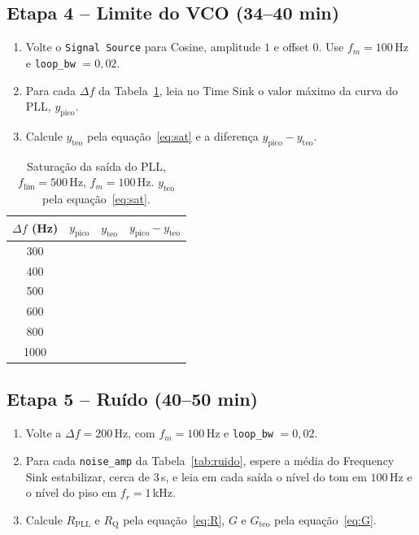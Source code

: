 \documentclass[11pt,a4paper]{article}
\begin{document}
\subsection*{Etapa 4 -- Limite do VCO (34--40 min)}

\begin{instrucao}
\begin{enumerate}[label=\arabic*.]
  \item Volte o \texttt{Signal Source} para Cosine, amplitude $1$ e offset $0$.
    Use $f_m = 100$\,Hz e \texttt{loop\_bw} $= 0{,}02$.
  \item Para cada $\Delta f$ da Tabela~\ref{tab:sat}, leia no Time Sink o
    valor máximo da curva do PLL, $y_\text{pico}$.
  \item Calcule $y_\text{teo}$ pela equação~\eqref{eq:sat} e a diferença
    $y_\text{pico} - y_\text{teo}$.
\end{enumerate}
\end{instrucao}

\begin{table}[H]
  \centering
  \begin{tabular}{c c c c}
    \toprule
    $\Delta f$ (Hz) & $y_\text{pico}$ & $y_\text{teo}$ & $y_\text{pico} - y_\text{teo}$ \\
    \midrule
    300  & & & \\
    400  & & & \\
    500  & & & \\
    600  & & & \\
    800  & & & \\
    1000 & & & \\
    \bottomrule
  \end{tabular}
  \caption{Saturação da saída do PLL, $f_\text{lim} = 500$\,Hz, $f_m = 100$\,Hz.
    $y_\text{teo}$ pela equação~\eqref{eq:sat}.}
  \label{tab:sat}
\end{table}

\subsection*{Etapa 5 -- Ruído (40--50 min)}

\begin{instrucao}
\begin{enumerate}[label=\arabic*.]
  \item Volte a $\Delta f = 200$\,Hz, com $f_m = 100$\,Hz e
    \texttt{loop\_bw} $= 0{,}02$.
  \item Para cada \texttt{noise\_amp} da Tabela~\ref{tab:ruido}, espere a
    média do Frequency Sink estabilizar, cerca de $3$\,s, e leia em cada saída
    o nível do tom em $100$\,Hz e o nível do piso em $f_r = 1$\,kHz.
  \item Calcule $R_\text{PLL}$ e $R_\text{Q}$ pela equação~\eqref{eq:R}, $G$ e
    $G_\text{teo}$ pela equação~\eqref{eq:G}.
\end{enumerate}
\end{instrucao}
\end{document}
